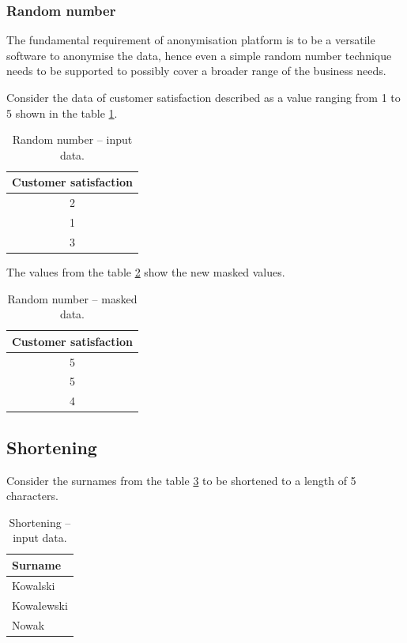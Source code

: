 \documentclass[a4paper,twoside,12pt]{book}
\begin{document}
\subsubsection{Random number}

The fundamental requirement of anonymisation platform is to be a versatile software to anonymise the data, hence even a simple random number technique needs to be supported to possibly cover a broader range of the business needs.

Consider the data of customer satisfaction described as a value ranging from 1 to 5 shown in the table \ref{id:tab:random_number_raw}.

\begin{table}[h]
\centering
\caption{Random number – input data.}
\label{id:tab:random_number_raw}
\begin{tabular}{c}
\toprule
Customer satisfaction \\ \midrule
2                     \\
1                     \\
3                     \\ \bottomrule
\end{tabular}
\end{table}

The values from the table \ref{id:tab:random_number_masked} show the new masked values.

\begin{table}[h]
\centering
\caption{Random number – masked data.}
\label{id:tab:random_number_masked}
\begin{tabular}{c}
\toprule
Customer satisfaction \\ \midrule
5                     \\
5                     \\
4                     \\ \bottomrule
\end{tabular}
\end{table}

\subsection{Shortening}
Consider the surnames from the table \ref{id:tab:shortening_raw} to be shortened to a length of 5 characters.

\begin{table}[h]
\centering
\caption{Shortening – input data.}
\label{id:tab:shortening_raw}
\begin{tabular}{l}
\toprule
Surname    \\ \midrule
Kowalski   \\
Kowalewski \\
Nowak      \\ \bottomrule
\end{tabular}
\end{table}
\end{document}
